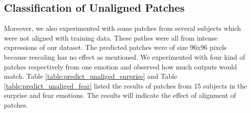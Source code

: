 \subsection{Classification of Unaligned Patches}\label{sec:experiments:unaligned}
Moreover, we also experimented with some patches from several subjects which were not aligned with training data. These pathes were all from intense expressions of our dataset. The predicted patches were of size 96x96 pixels because rescaling has no effect as mentioned. We experimented with four kind of patches respectively from one emotion and observed how much outputs would match. Table \ref{table:predict_unaliged_surprise} and Table \ref{table:predict_unaliged_fear} listed the results of patches from 15 subjects in the surprise and fear emotions. The results will indicate the effect of alignment of patches.


